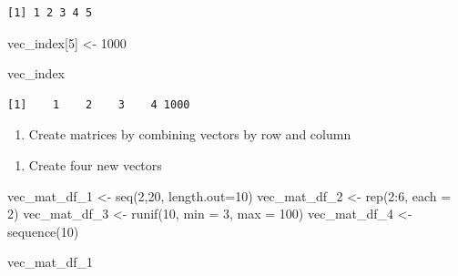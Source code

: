 \documentclass[
  letterpaper,
  DIV=11,
  numbers=noendperiod]{scrreprt}
\newenvironment{Shaded}{\begin{snugshade}}{\end{snugshade}}
\newcommand{\AttributeTok}[1]{\textcolor[rgb]{0.40,0.45,0.13}{#1}}
\newcommand{\DecValTok}[1]{\textcolor[rgb]{0.68,0.00,0.00}{#1}}
\newcommand{\FunctionTok}[1]{\textcolor[rgb]{0.28,0.35,0.67}{#1}}
\newcommand{\NormalTok}[1]{\textcolor[rgb]{0.00,0.23,0.31}{#1}}
\newcommand{\OtherTok}[1]{\textcolor[rgb]{0.00,0.23,0.31}{#1}}
\newcommand{\SpecialCharTok}[1]{\textcolor[rgb]{0.37,0.37,0.37}{#1}}
\providecommand{\tightlist}{%
  \setlength{\itemsep}{0pt}\setlength{\parskip}{0pt}}\usepackage{longtable,booktabs,array}
\begin{document}
\begin{verbatim}
[1] 1 2 3 4 5
\end{verbatim}

\begin{Shaded}
\begin{Highlighting}[]
\NormalTok{vec\_index[}\DecValTok{5}\NormalTok{] }\OtherTok{\textless{}{-}} \DecValTok{1000}
\end{Highlighting}
\end{Shaded}

\begin{Shaded}
\begin{Highlighting}[]
\NormalTok{vec\_index}
\end{Highlighting}
\end{Shaded}

\begin{verbatim}
[1]    1    2    3    4 1000
\end{verbatim}

\begin{enumerate}
\def\labelenumi{\Alph{enumi})}
\setcounter{enumi}{4}
\tightlist
\item
  Create matrices by combining vectors by row and column
\end{enumerate}

\begin{enumerate}
\def\labelenumi{\arabic{enumi}.}
\tightlist
\item
  Create four new vectors
\end{enumerate}

\begin{Shaded}
\begin{Highlighting}[]
\NormalTok{vec\_mat\_df\_1 }\OtherTok{\textless{}{-}} \FunctionTok{seq}\NormalTok{(}\DecValTok{2}\NormalTok{,}\DecValTok{20}\NormalTok{, }\AttributeTok{length.out=}\DecValTok{10}\NormalTok{)}
\NormalTok{vec\_mat\_df\_2 }\OtherTok{\textless{}{-}} \FunctionTok{rep}\NormalTok{(}\DecValTok{2}\SpecialCharTok{:}\DecValTok{6}\NormalTok{, }\AttributeTok{each =} \DecValTok{2}\NormalTok{)}
\NormalTok{vec\_mat\_df\_3 }\OtherTok{\textless{}{-}} \FunctionTok{runif}\NormalTok{(}\DecValTok{10}\NormalTok{, }\AttributeTok{min =} \DecValTok{3}\NormalTok{, }\AttributeTok{max =} \DecValTok{100}\NormalTok{)}
\NormalTok{vec\_mat\_df\_4 }\OtherTok{\textless{}{-}} \FunctionTok{sequence}\NormalTok{(}\DecValTok{10}\NormalTok{)}

\NormalTok{vec\_mat\_df\_1}
\end{Highlighting}
\end{Shaded}
\end{document}
